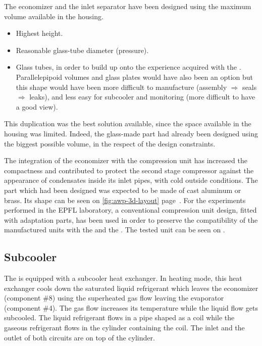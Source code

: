 The economizer and the inlet separator have been
designed using the maximum volume available in the housing.

\begin{itemize}
\item Highest height.
\item Reasonable glass-tube diameter (pressure).
\item Glass tubes, in order to build up onto the experience acquired
  with the \BWP{}. Parallelepipoid volumes and glass plates would have
  also been an option but this shape would have been more difficult to
  manufacture (assembly $\Rightarrow$ seals $\Rightarrow$ leaks), and
  less easy for subcooler and monitoring (more difficult to have a
  good view).
\end{itemize}

This duplication was the best solution available, since the space
available in the housing was limited. Indeed, the glass-made part had
already been designed using the biggest possible volume, in the
respect of the design constraints.

The integration of the economizer with the compression unit has
increased the compactness and contributed to protect the second stage
compressor against the appearance of condensates inside its inlet
pipes, with cold outside conditions. The part which had been designed
was expected to be made of cast aluminum or brass. Its shape can be
seen on \cref{fig:awp-3d-layout} page~\pageref{fig:awp-3d-layout}. For
the experiments performed in the EPFL laboratory, a conventional
compression unit design, fitted with adaptation parts, has been used
in order to preserve the compatibility of the manufactured units with
the \BWP{} and the \AWP{}. The tested unit can be seen on
.

\subsection{Subcooler}
\label{sec:awp-subcooler-details}

The \AWP{} is equipped with a subcooler heat
exchanger. In heating mode, this heat exchanger cools down the
saturated liquid refrigerant which leaves the economizer (component
\#8) using the superheated gas flow
leaving the evaporator (component \#4). The gas flow increases its
temperature while the liquid flow gets subcooled. The liquid
refrigerant flows in a pipe shaped as a coil while the gaseous
refrigerant flows in the cylinder containing the coil. The inlet and
the outlet of both circuits are on top of the cylinder.


